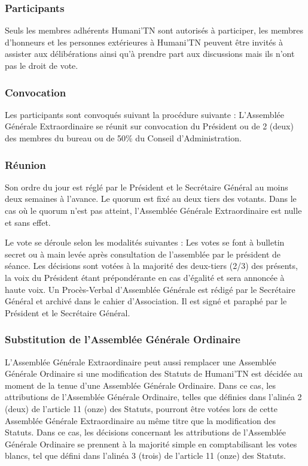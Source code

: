 \documentclass[12pt]{article}
\begin{document}
\subsubsection{Participants}
\label{sec:entites_decisionnelles:age:participants}

Seuls les membres adhérents Humani'TN sont autorisés à participer, les membres d’honneurs et les
personnes extérieures à Humani'TN peuvent être invités à assister aux délibérations ainsi qu’à prendre part
aux discussions mais ils n’ont pas le droit de vote.

\subsubsection{Convocation}
\label{sec:entites_decisionnelles:age:convocation}

Les participants sont convoqués suivant la procédure suivante : L’Assemblée Générale Extraordinaire se
réunit sur convocation du Président ou de 2 (deux) des membres du bureau ou de 50\% du Conseil
d’Administration.

\subsubsection{Réunion}
\label{sec:entites_decisionnelles:age:reunion}

Son ordre du jour est réglé par le Président et le Secrétaire Général au moins deux semaines à l’avance.
Le quorum est fixé au deux tiers des votants. Dans le cas où le quorum n’est pas atteint, l’Assemblée Générale
Extraordinaire est nulle et sans effet.



Le vote se déroule selon les modalités suivantes :
Les votes se font à bulletin secret ou à main levée après consultation de l’assemblée par le président de
séance. Les décisions sont votées à la majorité des deux-tiers (2/3) des présents, la voix du Président étant
prépondérante en cas d’égalité et sera annoncée à haute voix.
Un Procès-Verbal d’Assemblée Générale est rédigé par le Secrétaire Général et archivé dans le cahier
d’Association. Il est signé et paraphé par le Président et le Secrétaire Général.

\subsubsection{Substitution de l’Assemblée Générale Ordinaire}
\label{sec:entites_decisionnelles:age:substitution}

L’Assemblée Générale Extraordinaire peut aussi remplacer une Assemblée Générale Ordinaire si une
modification des Statuts de Humani'TN est décidée au moment de la tenue d’une Assemblée Générale
Ordinaire. Dans ce cas, les attributions de l’Assemblée Générale Ordinaire, telles que définies dans l’alinéa 2
(deux) de l’article 11 (onze) des Statuts, pourront être votées lors de cette Assemblée Générale Extraordinaire
au même titre que la modification des Statuts. Dans ce cas, les décisions concernant les attributions de
l’Assemblée Générale Ordinaire se prennent à la majorité simple en comptabilisant les votes blancs, tel que
défini dans l’alinéa 3 (trois) de l’article 11 (onze) des Statuts.
\end{document}
